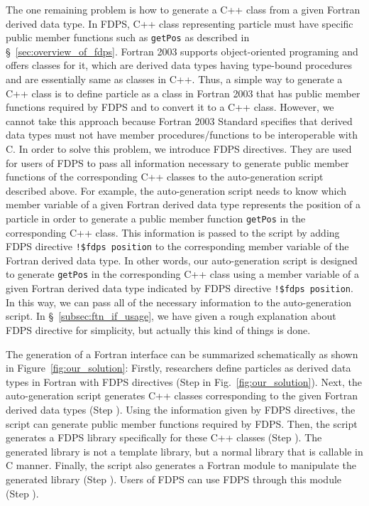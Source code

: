 \documentclass[proof,useamsfonts]{pasj01}
\begin{document}
The one remaining problem is how to generate a C++ class from a given Fortran derived data type. In FDPS, C++ class representing particle must have specific public member functions such as \texttt{getPos} as described in \S~\ref{sec:overview_of_fdps}. Fortran 2003 supports object-oriented programing and offers classes for it, which are derived data types having type-bound procedures and are essentially same as classes in C++. Thus, a simple way to generate a C++ class is to define particle as a class in Fortran 2003 that has public member functions required by FDPS and to convert it to a C++ class. However, we cannot take this approach because Fortran 2003 Standard specifies that derived data types must not have member procedures/functions to be interoperable with C. In order to solve this problem, we introduce FDPS directives. They are used for users of FDPS to pass all information necessary to generate public member functions of the corresponding C++ classes to the auto-generation script described above. For example, the auto-generation script needs to know which member variable of a given Fortran derived data type represents the position of a particle in order to generate a public member function \texttt{getPos} in the corresponding C++ class. This information is passed to the script by adding FDPS directive \texttt{!\$fdps position} to the corresponding member variable of the Fortran derived data type. In other words, our auto-generation script is designed to generate \texttt{getPos} in the corresponding C++ class using a member variable of a given Fortran derived data type indicated by FDPS directive \texttt{!\$fdps position}. In this way, we can pass all of the necessary information to the auto-generation script. In \S~\ref{subsec:ftn_if_usage}, we have given a rough explanation about FDPS directive for simplicity, but actually this kind of things is done.

The generation of a Fortran interface can be summarized schematically as shown in Figure~\ref{fig:our_solution}: Firstly, researchers define particles as derived data types in Fortran with FDPS directives (Step {\large {}\hbox{}} in Fig.~\ref{fig:our_solution}). Next, the auto-generation script generates C++ classes corresponding to the given Fortran derived data types (Step {\large {}\hbox{}}). Using the information given by FDPS directives, the script can generate public member functions required by FDPS. Then, the script generates a FDPS library specifically for these C++ classes (Step {\large {}\hbox{}}). The generated library is not a template library, but a normal library that is callable in C manner. Finally, the script also generates a Fortran module to manipulate the generated library (Step {\large {}\hbox{}}). Users of FDPS can use FDPS through this module (Step {\large {}\hbox{}}).
\end{document}

